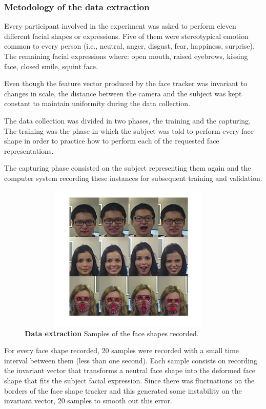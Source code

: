\documentclass[]{article}
\begin{document}
\subsubsection{Metodology of the data extraction}
Every participant involved in the experiment was asked to perform eleven different facial shapes or expressions.
Five of them were stereotypical emotion common to every person (i.e., neutral, anger, disgust, fear, happiness,
surprise). The remaining facial expressions where: open mouth, raised eyebrows,
kissing face, closed smile, squint face.

Even though the feature vector produced  by the face tracker was invariant to changes in scale, the distance
between the camera and the subject was kept constant to maintain uniformity during the data collection.

The data collection was divided in two phases, the training and the capturing. The training was the phase in which the
subject was told to perform every face shape in order to practice how to perform each of the requested face
representations.

The capturing phase consisted on the subject representing them again and the computer system recording these instances
for subsequent training and validation. 

\begin{figure}[ht]
\begin{center}
\vspace{-3mm}
\includegraphics[width=0.95\textwidth,height=70mm]{figures/dataExtrationExamples.jpg}
\end{center}
\caption{\textbf{Data extraction} Samples of the face shapes recorded.}
\label{figureLabel}
\end{figure}

For every face shape recorded, 20 samples were recorded with a small time
interval between them (less than one second). Each sample consists on recording
the invariant vector that transforms a neutral face shape into the deformed
face shape that fits the subject facial expression. Since there was fluctuations on the borders
of the face shape tracker and this generated some instability on the
invariant vector, 20 samples to smooth out this error.
\end{document}
